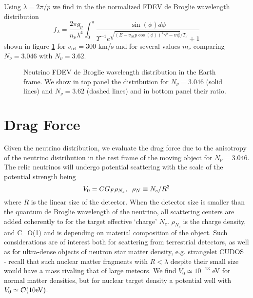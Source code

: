 Using $\lambda=2\pi/p$ we find  in the the normalized FDEV de Broglie wavelength distribution
\begin{equation}
f_\lambda=\frac{ 2\pi g_\nu}{n_\nu\lambda^4}\!\!\int_0^\pi\!\!\! \!\frac{\sin(\phi) d\phi}{\Upsilon^{-1}e^{\sqrt{( E-v_{\text{rel}} p \cos(\phi))^2\gamma^2-m_\nu^2}/T_\nu}\!\!+\!1}
\end{equation}
shown in figure \ref{fig:deBrogle_300} for $v_{\text{rel}}=300$ km/s and for several values $m_\nu$ comparing  $N_\nu=3.046$ with $N_\nu=3.62$. %
\begin{figure}%
\begin{minipage}{\linewidth}
\end{minipage}
\caption{Neutrino  FDEV de Broglie wavelength  distribution in the Earth frame. We show in top panel the distribution for $N_\nu=3.046$ (solid lines) and $N_\nu=3.62$ (dashed lines) and in bottom panel their ratio.}\label{fig:deBrogle_300}
 \end{figure}

\section{Drag Force}
Given the neutrino distribution, we evaluate the drag force due to the anisotropy of the neutrino distribution in the rest frame of the moving object for $N_\nu=3.046$. The relic neutrinos will undergo potential scattering with the scale of the potential strength being
\begin{equation}\label{V0}
V_0=CG_F\rho_{N_c},\hspace{2mm} \rho_N\equiv N_c/R^3
\end{equation}
where $R$ is the linear size of the detector.  When the detector size is smaller than the quantum de Broglie wavelength of the neutrino, all scattering centers are added coherently to for the target effective `charge' $N_c$.  $\rho_{N_c}$ is the charge density, and C=O(1) and is depending on material composition of the object. Such considerations are of interest both for scattering from terrestrial detectors, as well as for ultra-dense objects of neutron star matter density, e.g.   strangelet  CUDOS~\cite{CUDO} - recall that such nuclear matter fragments with $R<\lambda$  despite their small size would have a mass rivaling that of large meteors. We find $V_0\simeq 10^{-13}$ eV for normal matter densities, but for nuclear target density a potential well with $V_0\simeq {\cal O}(10 {\rm eV})$.  

